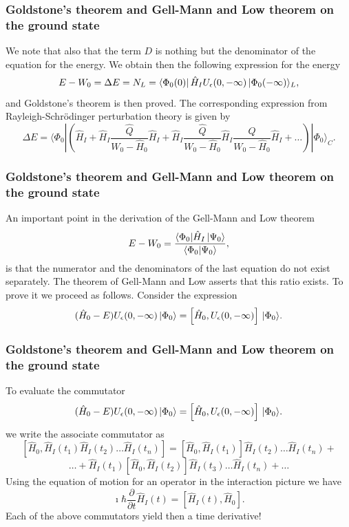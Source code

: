 \frame
{
\frametitle{Goldstone's theorem and Gell-Mann and Low theorem on the ground state}
\begin{small}
{\scriptsize
We note that also that the term $D$ is nothing but the denominator of the equation for the energy. We obtain then the following expression for the energy
\[
E-W_0=\Delta E=N_L= \bra{\Phi_0(0)}\hat{H}_IU_{\epsilon}(0,-\infty )\,|{\Phi_0(-\infty)}\rangle_L,
\]
and Goldstone's theorem is then proved. 
The corresponding expression from Rayleigh-Schr\"odinger perturbation theory is given by
\[
\Delta E=\langle \Phi_0|\left(\hat{H}_I+\hat{H}_I\frac{\hat{Q}}{W_0-\hat{H}_0}\hat{H}_I+
\hat{H}_I\frac{\hat{Q}}{W_0-\hat{H}_0}\hat{H}_I\frac{\hat{Q}}{W_0-\hat{H}_0}\hat{H}_I+\dots\right)|\Phi_0\rangle_C.
\]
}
\end{small}
}


\frame
{
\frametitle{Goldstone's theorem and Gell-Mann and Low theorem on the ground state}
\begin{small}
{\scriptsize
An important point in the derivation of the Gell-Mann and Low theorem
\[
E-W_0=\frac{\langle \Phi_0|\hat{H}_I\,|{\Psi_0}\rangle}{\left\langle\Phi_0 | \Psi_0 \right\rangle},
\]
is that the numerator and the denominators of the last equation do not exist separately. The theorem of Gell-Mann and Low asserts that this ratio exists. To prove it we proceed as follows. Consider the expression
\[
(\hat{H}_0-E)U_{\epsilon }(0,-\infty )\,|{\Phi_0}\rangle=\left[\hat{H}_0,U_{\epsilon }(0,-\infty )\right]\,|{\Phi_0}\rangle.
\]
}
\end{small}
}

\frame
{
\frametitle{Goldstone's theorem and Gell-Mann and Low theorem on the ground state}
\begin{small}
{\scriptsize
To evaluate the commutator 
\[
(\hat{H}_0-E)U_{\epsilon }(0,-\infty )\,|{\Phi_0}\rangle=\left[\hat{H}_0,U_{\epsilon }(0,-\infty )\right]\,|{\Phi_0}\rangle.
\]
we write the associate commutator as
\[
\left[\hat{H}_0,\hat{H}_I(t_1)\hat{H}_I(t_2)\dots \hat{H}_I(t_n)\right]=
\left[\hat{H}_0,\hat{H}_I(t_1)\right]\hat{H}_I(t_2)\dots \hat{H}_I(t_n)+
\]
\[
\dots+\hat{H}_I(t_1)\left[\hat{H}_0,\hat{H}_I(t_2)\right]\hat{H}_I(t_3)\dots \hat{H}_I(t_n)+\dots
\]
Using the equation of motion for an operator in the interaction picture we have
\[
\imath \hbar\frac{\partial }{\partial t}\hat{H}_I(t) = \left[\hat{H}_I(t),\hat{H}_0\right].
\]
Each of the above commutators yield then a time derivative!
}
\end{small}
}

